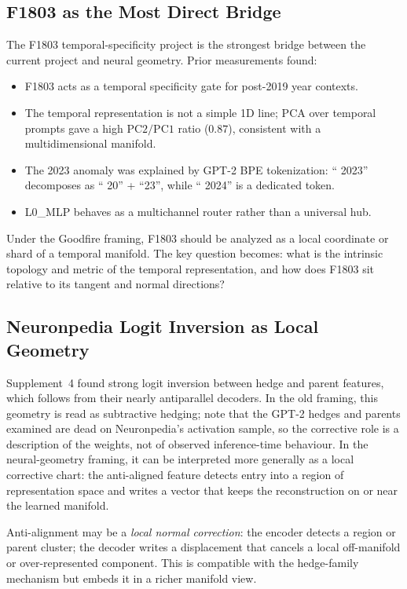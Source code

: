 \documentclass[11pt,a4paper]{article}
\begin{document}
\subsection{F1803 as the Most Direct Bridge}

The F1803 temporal-specificity project is the strongest bridge between the current project and neural geometry. Prior measurements found:
\begin{itemize}[noitemsep]
  \item F1803 acts as a temporal specificity gate for post-2019 year contexts.
  \item The temporal representation is not a simple 1D line; PCA over temporal prompts gave a high $\mathrm{PC2}/\mathrm{PC1}$ ratio ($0.87$), consistent with a multidimensional manifold.
  \item The 2023 anomaly was explained by GPT-2 BPE tokenization: `` 2023'' decomposes as `` 20'' + ``23'', while `` 2024'' is a dedicated token.
  \item L0\_MLP behaves as a multichannel router rather than a universal hub.
\end{itemize}

Under the Goodfire framing, F1803 should be analyzed as a local coordinate or shard of a temporal manifold. The key question becomes: what is the intrinsic topology and metric of the temporal representation, and how does F1803 sit relative to its tangent and normal directions?

\subsection{Neuronpedia Logit Inversion as Local Geometry}

Supplement~4 found strong logit inversion between hedge and parent features, which follows from their nearly antiparallel decoders. In the old framing, this geometry is read as subtractive hedging; note that the GPT-2 hedges and parents examined are dead on Neuronpedia's activation sample, so the corrective role is a description of the weights, not of observed inference-time behaviour. In the neural-geometry framing, it can be interpreted more generally as a local corrective chart: the anti-aligned feature detects entry into a region of representation space and writes a vector that keeps the reconstruction on or near the learned manifold.

\begin{keyinsight}
Anti-alignment may be a \emph{local normal correction}: the encoder detects a region or parent cluster; the decoder writes a displacement that cancels a local off-manifold or over-represented component. This is compatible with the hedge-family mechanism but embeds it in a richer manifold view.
\end{keyinsight}
\end{document}
